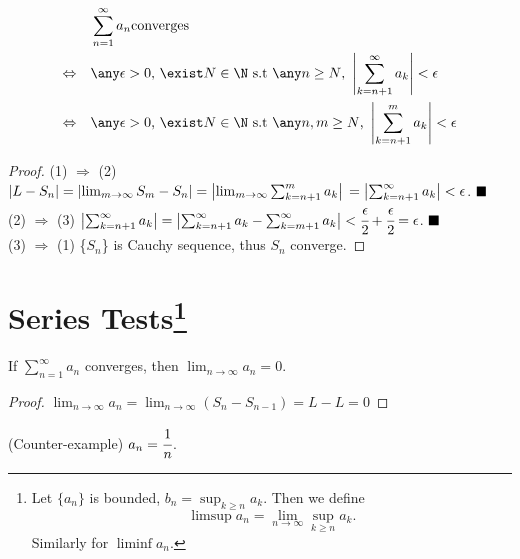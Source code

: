 \begin{theorem}
\begin{align}
                          & \sum_{n=1}^\infty a_n \text{converges} \\
    \Leftrightarrow \quad & \any \epsilon>0\text{, }\exist N \in \N\text{ s.t }\any n \geq N\text{, }\left|\sum_{k=n+1}^\infty a_k \right| < \epsilon \\
    \Leftrightarrow \quad &\any \epsilon>0\text{, }\exist N \in \N\text{ s.t }\any n,m \geq N\text{, }\left|\sum_{k=n+1}^m a_k \right| < \epsilon
\end{align}
\end{theorem} 
\begin{proof}
    (1) $\Rightarrow$ (2)\qquad $ \left|L-S_n\right| = \left|\lim_{m\to\infty} S_m - S_n\right| = \left|\lim_{m\to\infty} \sum_{k=n+1}^m a_k\right|\\ = \left|\sum_{k=n+1}^\infty a_k\right| < \epsilon$. $\hfill\blacksquare$ \vspace{1em}\\
    (2) $\Rightarrow$ (3) \qquad $\left|\sum_{k=n+1}^\infty a_k\right| = \left|\sum_{k=n+1}^\infty a_k - \sum_{k=m+1}^\infty a_k\right| < \cfrac{\epsilon}{2} + \cfrac{\epsilon}{2} = \epsilon$.  $\hfill\blacksquare$ \vspace{1em}\\
    (3) $\Rightarrow$ (1) \qquad \{$S_n$\} is Cauchy sequence, thus $S_n$ converge. 
\end{proof}

\section*{Series Tests\footnote{
Let $\{a_n\}$ is bounded, $b_n=\sup_{k\geq n} a_k$. Then we define
\[
    \limsup a_n = \lim_{n \rightarrow \infty} \sup_{k\geq n} a_k.
\]
Similarly for $\liminf a_n$.
}}

\begin{theorem}
\label{n_th term test}
    If $\sum_{n=1}^\infty a_n$ converges, then $\lim_{n\to\infty} a_n = 0$.
\end{theorem}
\begin{proof}
    $\lim_{n\to\infty} a_n = \lim_{n\to\infty} (S_n -S_{n-1}) = L -L =0$
\end{proof}
\begin{example}
    (Counter-example) $a_n = \cfrac{1}{n}$.
\end{example}

